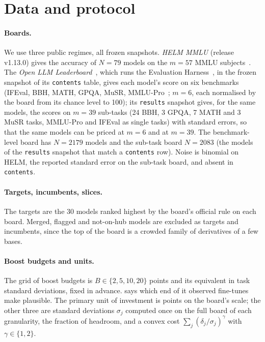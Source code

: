 \section{Data and protocol}
\label{sec:data}

\paragraph{Boards.}
We use three public regimes, all frozen snapshots. \emph{HELM MMLU} (release v1.13.0) gives the accuracy of $N=79$ models on the $m=57$ MMLU subjects~\citep{hendrycks2021mmlu,liang2022helm}. The \emph{Open LLM Leaderboard}~\citep{fourrier2024olb}, which runs the Evaluation Harness~\citep{gao2023harness}, in the frozen snapshot of its \texttt{contents} table, gives each model's score on six benchmarks (IFEval, BBH, MATH, GPQA, MuSR, MMLU-Pro~\citep{zhou2023ifeval,suzgun2022bbh,hendrycks2021math,rein2023gpqa,sprague2023musr,wang2024mmlupro}; $m=6$, each normalised by the board from its chance level to 100); its \texttt{results} snapshot gives, for the same models, the scores on $m=39$ sub-tasks (24 BBH, 3 GPQA, 7 MATH and 3 MuSR tasks, MMLU-Pro and IFEval as single tasks) with standard errors, so that the same models can be priced at $m=6$ and at $m=39$. The benchmark-level board has $N=2179$ models and the sub-task board $N=2083$ (the models of the \texttt{results} snapshot that match a \texttt{contents} row). Noise is binomial on HELM, the reported standard error on the sub-task board, and absent in \texttt{contents}.


\paragraph{Targets, incumbents, slices.}
The targets are the 30 models ranked highest by the board's official rule on each board. Merged, flagged and not-on-hub models are excluded as targets and incumbents, since the top of the board is a crowded family of derivatives of a few bases.

\paragraph{Boost budgets and units.}
The grid of boost budgets is $B\in\{2,5,10,20\}$ points and its equivalent in task standard deviations, fixed in advance.  says which end of it observed fine-tunes make plausible. The primary unit of investment is points on the board's scale; the other three are standard deviations $\sigma_j$ computed once on the full board of each granularity, the fraction of headroom, and a convex cost $\sum_j(\delta_j/\sigma_j)^\gamma$ with $\gamma\in\{1,2\}$.

